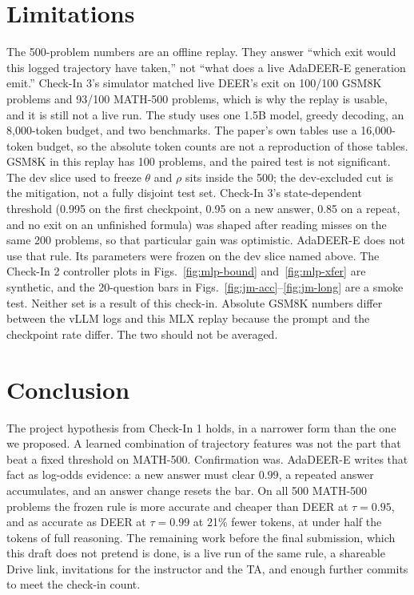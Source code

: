 \documentclass[conference]{IEEEtran}
\begin{document}
\section{Limitations}
The 500-problem numbers are an offline replay.
They answer ``which exit would this logged trajectory have taken,'' not ``what does a live AdaDEER-E generation emit.''
Check-In 3's simulator matched live DEER's exit on 100/100 GSM8K problems and 93/100 MATH-500 problems, which is why the replay is usable, and it is still not a live run.
The study uses one 1.5B model, greedy decoding, an 8{,}000-token budget, and two benchmarks.
The paper's own tables use a 16{,}000-token budget, so the absolute token counts are not a reproduction of those tables.
GSM8K in this replay has 100 problems, and the paired test is not significant.
The dev slice used to freeze $\theta$ and $\rho$ sits inside the 500; the dev-excluded cut is the mitigation, not a fully disjoint test set.
Check-In 3's state-dependent threshold (0.995 on the first checkpoint, 0.95 on a new answer, 0.85 on a repeat, and no exit on an unfinished formula) was shaped after reading misses on the same 200 problems, so that particular gain was optimistic.
AdaDEER-E does not use that rule.
Its parameters were frozen on the dev slice named above.
The Check-In 2 controller plots in Figs.~\ref{fig:mlp-bound} and~\ref{fig:mlp-xfer} are synthetic, and the 20-question bars in Figs.~\ref{fig:jm-acc}--\ref{fig:jm-long} are a smoke test.
Neither set is a result of this check-in.
Absolute GSM8K numbers differ between the vLLM logs and this MLX replay because the prompt and the checkpoint rate differ.
The two should not be averaged.

\section{Conclusion}
The project hypothesis from Check-In 1 holds, in a narrower form than the one we proposed.
A learned combination of trajectory features was not the part that beat a fixed threshold on MATH-500.
Confirmation was.
AdaDEER-E writes that fact as log-odds evidence: a new answer must clear $0.99$, a repeated answer accumulates, and an answer change resets the bar.
On all 500 MATH-500 problems the frozen rule is more accurate and cheaper than DEER at $\tau=0.95$, and as accurate as DEER at $\tau=0.99$ at 21\% fewer tokens, at under half the tokens of full reasoning.
The remaining work before the final submission, which this draft does not pretend is done, is a live run of the same rule, a shareable Drive link, invitations for the instructor and the TA, and enough further commits to meet the check-in count.
\end{document}
